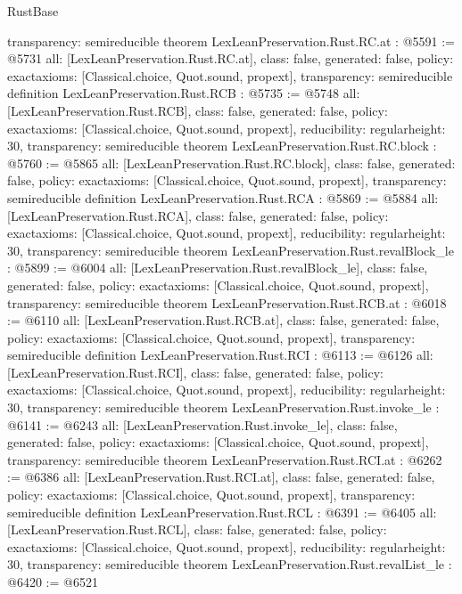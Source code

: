 \begin{lexlean}{RustBase}
\begin{coremodule}
{  transparency: semireducible
}
theorem LexLeanPreservation.Rust.RC.at : @5591 := @5731 {
  all: [LexLeanPreservation.Rust.RC.at],
  class: false,
  generated: false,
  policy: exact{axioms: [Classical.choice, Quot.sound, propext]},
  transparency: semireducible
}
definition LexLeanPreservation.Rust.RCB : @5735 := @5748 {
  all: [LexLeanPreservation.Rust.RCB],
  class: false,
  generated: false,
  policy: exact{axioms: [Classical.choice, Quot.sound, propext]},
  reducibility: regular{height: 30},
  transparency: semireducible
}
theorem LexLeanPreservation.Rust.RC.block : @5760 := @5865 {
  all: [LexLeanPreservation.Rust.RC.block],
  class: false,
  generated: false,
  policy: exact{axioms: [Classical.choice, Quot.sound, propext]},
  transparency: semireducible
}
definition LexLeanPreservation.Rust.RCA : @5869 := @5884 {
  all: [LexLeanPreservation.Rust.RCA],
  class: false,
  generated: false,
  policy: exact{axioms: [Classical.choice, Quot.sound, propext]},
  reducibility: regular{height: 30},
  transparency: semireducible
}
theorem LexLeanPreservation.Rust.revalBlock_le : @5899 := @6004 {
  all: [LexLeanPreservation.Rust.revalBlock_le],
  class: false,
  generated: false,
  policy: exact{axioms: [Classical.choice, Quot.sound, propext]},
  transparency: semireducible
}
theorem LexLeanPreservation.Rust.RCB.at : @6018 := @6110 {
  all: [LexLeanPreservation.Rust.RCB.at],
  class: false,
  generated: false,
  policy: exact{axioms: [Classical.choice, Quot.sound, propext]},
  transparency: semireducible
}
definition LexLeanPreservation.Rust.RCI : @6113 := @6126 {
  all: [LexLeanPreservation.Rust.RCI],
  class: false,
  generated: false,
  policy: exact{axioms: [Classical.choice, Quot.sound, propext]},
  reducibility: regular{height: 30},
  transparency: semireducible
}
theorem LexLeanPreservation.Rust.invoke_le : @6141 := @6243 {
  all: [LexLeanPreservation.Rust.invoke_le],
  class: false,
  generated: false,
  policy: exact{axioms: [Classical.choice, Quot.sound, propext]},
  transparency: semireducible
}
theorem LexLeanPreservation.Rust.RCI.at : @6262 := @6386 {
  all: [LexLeanPreservation.Rust.RCI.at],
  class: false,
  generated: false,
  policy: exact{axioms: [Classical.choice, Quot.sound, propext]},
  transparency: semireducible
}
definition LexLeanPreservation.Rust.RCL : @6391 := @6405 {
  all: [LexLeanPreservation.Rust.RCL],
  class: false,
  generated: false,
  policy: exact{axioms: [Classical.choice, Quot.sound, propext]},
  reducibility: regular{height: 30},
  transparency: semireducible
}
theorem LexLeanPreservation.Rust.revalList_le : @6420 := @6521 {
}
\end{coremodule}
\end{lexlean}
